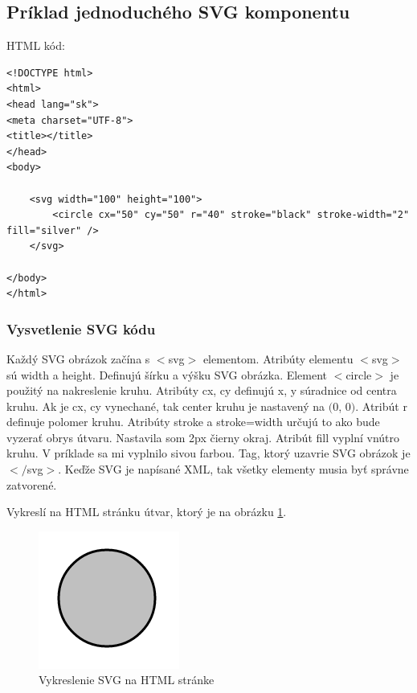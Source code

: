 \subsection{Príklad jednoduchého SVG komponentu}

HTML kód: 

\begin{lstlisting}
<!DOCTYPE html>
<html>
<head lang="sk">
<meta charset="UTF-8">
<title></title>
</head>
<body>

	<svg width="100" height="100">
		<circle cx="50" cy="50" r="40" stroke="black" stroke-width="2" fill="silver" />
	</svg>	
	
</body>
</html>

\end{lstlisting}


\subsubsection{Vysvetlenie SVG kódu}

Každý SVG obrázok začína s $<$svg$>$ elementom. Atribúty elementu $<$svg$>$ sú width a height. Definujú šírku a výšku SVG obrázka. Element $<$circle$>$ je použitý na nakreslenie kruhu. Atribúty cx, cy definujú x, y súradnice od centra kruhu. Ak je cx, cy vynechané, tak center kruhu je nastavený na $($0, 0$)$. Atribút r  definuje polomer kruhu. Atribúty stroke a stroke=width určujú to ako bude vyzerať obrys útvaru. Nastavila som 2px čierny okraj. 
Atribút fill vyplní vnútro kruhu. V príklade sa mi vyplnilo sivou farbou. Tag, ktorý uzavrie SVG obrázok je $<$$/$svg$>$. Keďže SVG je napísané XML, tak všetky elementy musia byť správne zatvorené. 


Vykreslí na HTML stránku útvar, ktorý je na obrázku \ref{jednoduchyKruh}.

\begin{figure}[ht]
	\begin{center}
		\includegraphics  {obrazky/jednoduchyKruh.png}
		\caption{Vykreslenie SVG na HTML stránke}
		\label{jednoduchyKruh}
	\end{center}
\end{figure}


